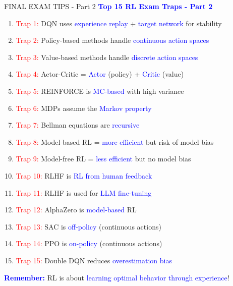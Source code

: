\documentclass[8pt]{beamer}
\begin{document}
\begin{frame}{FINAL EXAM TIPS - Part 2}
\fontsize{6.5}{7.5}\selectfont
\textcolor{blue}{\textbf{Top 15 RL Exam Traps - Part 2}}

\begin{enumerate}
\item \textcolor{red}{Trap 1:} DQN uses \textcolor{blue}{experience replay} + \textcolor{blue}{target network} for stability
\item \textcolor{red}{Trap 2:} Policy-based methods handle \textcolor{blue}{continuous action spaces}
\item \textcolor{red}{Trap 3:} Value-based methods handle \textcolor{blue}{discrete action spaces}
\item \textcolor{red}{Trap 4:} Actor-Critic = \textcolor{blue}{Actor} (policy) + \textcolor{blue}{Critic} (value)
\item \textcolor{red}{Trap 5:} REINFORCE is \textcolor{blue}{MC-based} with high variance
\item \textcolor{red}{Trap 6:} MDPs assume the \textcolor{blue}{Markov property}
\item \textcolor{red}{Trap 7:} Bellman equations are \textcolor{blue}{recursive}
\item \textcolor{red}{Trap 8:} Model-based RL = \textcolor{blue}{more efficient} but risk of model bias
\item \textcolor{red}{Trap 9:} Model-free RL = \textcolor{blue}{less efficient} but no model bias
\item \textcolor{red}{Trap 10:} RLHF is \textcolor{blue}{RL from human feedback}
\item \textcolor{red}{Trap 11:} RLHF is used for \textcolor{blue}{LLM fine-tuning}
\item \textcolor{red}{Trap 12:} AlphaZero is \textcolor{blue}{model-based} RL
\item \textcolor{red}{Trap 13:} SAC is \textcolor{blue}{off-policy} (continuous actions)
\item \textcolor{red}{Trap 14:} PPO is \textcolor{blue}{on-policy} (continuous actions)
\item \textcolor{red}{Trap 15:} Double DQN reduces \textcolor{blue}{overestimation bias}
\end{enumerate}

\textcolor{blue}{\textbf{Remember:}} RL is about \textcolor{blue}{learning optimal behavior through experience}!
\end{frame}
\end{document}
